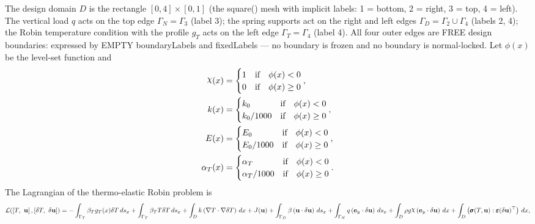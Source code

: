 \documentclass[preview]{standalone}
\let\oldcdot\cdot
\let\cdot\oldcdot
\begin{document}
The design domain $D$ is the rectangle $[0,4]\times[0,1]$ (the square() mesh with implicit labels: 1 = bottom, 2 = right, 3 = top, 4 = left).  The vertical load $q$ acts on the top edge $\Gamma_{N}=\Gamma_{3}$ (label 3); the spring supports act on the right and left edges $\Gamma_{D}=\Gamma_{2}\cup\Gamma_{4}$ (labels 2, 4); the Robin temperature condition with the profile $g_{T}$ acts on the left edge $\Gamma_{T}=\Gamma_{4}$ (label 4).  All four outer edges are FREE design boundaries: expressed by EMPTY boundaryLabels and fixedLabels — no boundary is frozen and no boundary is normal-locked.
Let $\phi(x)$ be the level-set function and
 \begin{align*}\raisebox{\depth}{$\chi$}(x) &= \begin{cases} 1 & \mbox{if}\quad \phi(x) < 0 \\ 0 & \mbox{if}\quad \phi(x)  \ge 0 \end{cases},\\
k(x) &= \begin{cases} k_0 & \mbox{if}\quad \phi(x) < 0 \\ k_0/1000 & \mbox{if}\quad \phi(x)  \ge 0 \end{cases},\\
E(x) &= \begin{cases} E_0 & \mbox{if}\quad \phi(x) < 0 \\ E_0/1000 & \mbox{if}\quad \phi(x)  \ge 0 \end{cases},\\
\alpha_{T}(x) &= \begin{cases} \alpha_T & \mbox{if}\quad \phi(x) < 0 \\ \alpha_T/1000 & \mbox{if}\quad \phi(x)  \ge 0 \end{cases}.\end{align*}
The Lagrangian of the thermo-elastic Robin problem is
\begin{dmath*}
\mathcal L(\left[ T, \  {\mathbf{ u }}\right],\left[ \delta T, \  {\delta\mathbf{  u }}\right]) = -  \int_{\Gamma_{T}} \beta_{T} g_{T}(x) \delta T \,ds_x +  \int_{\Gamma_{T}} \beta_{T} T \delta T \,ds_x +  \int_{D} k \left(  \nabla T  \cdot  \nabla \delta T  \right) \,dx + J({\mathbf{ u }}) +  \int_{\Gamma_D} \beta \left( {\mathbf{ u }} \cdot {\delta\mathbf{  u }} \right) \,ds_x +  \int_{\Gamma_N} q \left( \mathbf e_y \cdot {\delta\mathbf{  u }} \right) \,ds_x +  \int_{D} \rho g \raisebox{\depth}{$\chi$} \left( \mathbf e_y \cdot {\delta\mathbf{  u }} \right) \,dx +  \int_{D} \left( \pmb \sigma(T,{\mathbf{ u }}) \mathrel{:}  \pmb\varepsilon({\delta\mathbf{  u }})^\top  \right) \,dx , 
\end{dmath*}
\end{document}
